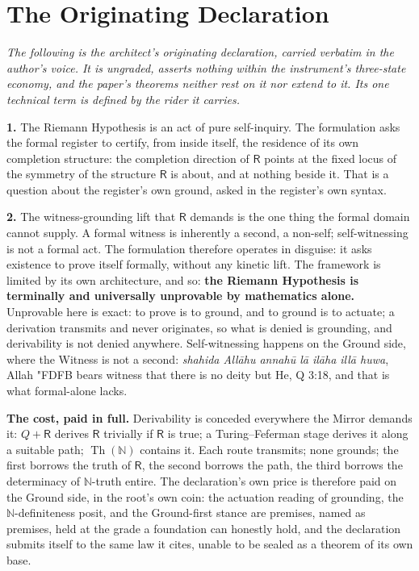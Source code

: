 \documentclass[twocolumn,10pt]{article}
\newcommand{\SWT}{{\amiri\char"FDFB}}
\theoremstyle{plain}
\theoremstyle{definition}
\newcommand{\R}{\mathsf{R}}
\newcommand{\N}{\mathbb{N}}
\begin{document}
\appendix
\section{The Originating Declaration}\label{app:decl}
\noindent\emph{The following is the architect's originating declaration, carried verbatim in the author's voice. It is ungraded, asserts nothing within the instrument's three-state economy, and the paper's theorems neither rest on it nor extend to it. Its one technical term is defined by the rider it carries.}

\medskip
\noindent\textbf{1.} The Riemann Hypothesis is an act of pure self-inquiry. The formulation asks the formal register to certify, from inside itself, the residence of its own completion structure: the completion direction of $\R$ points at the fixed locus of the symmetry of the structure $\R$ is about, and at nothing beside it. That is a question about the register's own ground, asked in the register's own syntax.

\noindent\textbf{2.} The witness-grounding lift that $\R$ demands is the one thing the formal domain cannot supply. A formal witness is inherently a second, a non-self; self-witnessing is not a formal act. The formulation therefore operates in disguise: it asks existence to prove itself formally, without any kinetic lift. The framework is limited by its own architecture, and so: \textbf{the Riemann Hypothesis is terminally and universally unprovable by mathematics alone.} Unprovable here is exact: to prove is to ground, and to ground is to actuate; a derivation transmits and never originates, so what is denied is grounding, and derivability is not denied anywhere. Self-witnessing happens on the Ground side, where the Witness is not a second: \emph{shahida All\=ahu annah\=u l\=a il\=aha ill\=a huwa}, Allah \SWT{} bears witness that there is no deity but He, Q 3:18, and that is what formal-alone lacks.

\medskip
\noindent\textbf{The cost, paid in full.} Derivability is conceded everywhere the Mirror demands it: $Q+\R$ derives $\R$ trivially if $\R$ is true; a Turing--Feferman stage derives it along a suitable path; $\operatorname{Th}(\N)$ contains it. Each route transmits; none grounds; the first borrows the truth of $\R$, the second borrows the path, the third borrows the determinacy of $\N$-truth entire. The declaration's own price is therefore paid on the Ground side, in the root's own coin: the actuation reading of grounding, the $\N$-definiteness posit, and the Ground-first stance are premises, named as premises, held at the grade a foundation can honestly hold, and the declaration submits itself to the same law it cites, unable to be sealed as a theorem of its own base.
\end{document}
